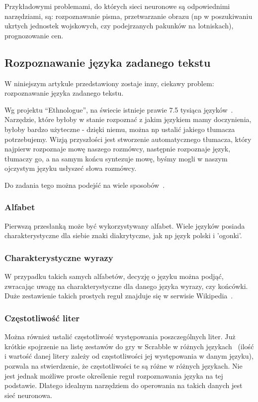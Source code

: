 \documentclass[journal]{IEEEtran}
\begin{document}
Przykładowymi problemami, do których sieci neuronowe są odpowiednimi
narzędziami, są: rozpoznawanie pisma, przetwarzanie obrazu (np w poszukiwaniu ukrtych jednostek wojskowych, czy
podejrzanych pakunków na lotniskach), prognozowanie cen.


\subsection{Rozpoznawanie języka zadanego tekstu}
W niniejszym artykule przedstawiony zostaje inny, ciekawy problem: rozpoznawanie języka zadanego tekstu.

Wg projektu ``Ethnologue'', na świecie istnieje prawie 7.5 tysiąca języków~\cite{ethnologue}. Narzędzie,
które byłoby w stanie rozpoznać z jakim językiem mamy doczynienia, byłoby bardzo użyteczne - dzięki niemu,
można np ustalić jakiego tłumacza potrzebujemy. Wizją przyszłości jest stworzenie automatycznego tłumacza,
który najpierw rozpoznaje mowę naszego rozmówcy, następnie rozpoznaje język, tłumaczy go, a na samym końcu
syntezuje mowę, byśmy mogli w naszym ojczystym języku usłyszeć słowa rozmówcy.

Do zadania tego można podejść na wiele sposobów~\cite{smykowski:jak_google_rozpoznaje}.

\subsubsection{Alfabet}
Pierwszą przesłanką może być wykorzystywany alfabet. Wiele języków posiada charakterystyczne dla siebie znaki
diakrytyczne, jak np język polski i 'ogonki'.

\subsubsection{Charakterystyczne wyrazy}
W przypadku takich samych alfabetów, decyzję o języku można podjąć, zwracając uwagę na charakterystyczne dla
danego języka wyrazy, czy końcówki. Duże zestawienie takich prostych reguł znajduje się w serwisie Wikipedia~\cite{wiki:langs}.

\subsubsection{Częstotliwość liter}
Można również ustalić częstotliwość występowania poszczególnych liter. Już krótkie spojrzenie na listę zestawów do gry
w Scrabble w różnych językach~\cite{wiki:scrabble} (ilość i wartość danej litery zależy od częstotliwości jej występowania
w danym języku), pozwala na stwierdzenie, że częstotliwości te są różne w różnych językach. Nie jest jednak możliwe proste
określenie reguł rozpoznawania języka na tej podstawie. Dlatego idealnym narzędziem do operowania na takich danych jest
sieć neuronowa.
\end{document}
